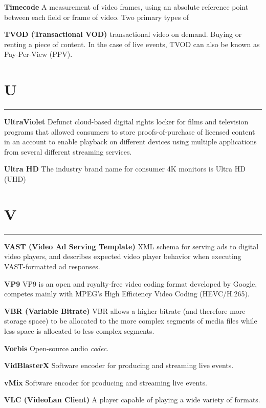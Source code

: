 \smallskip
\textbf{Timecode}
A measurement of video frames, using an absolute reference point between each field or frame of video. Two primary types of

\smallskip
\textbf{TVOD (Transactional VOD)}
transactional video on demand. Buying or renting a piece of content. In the case of live events, TVOD can also be known as Pay-Per-View (PPV).


\section{U}
\hrule

\medskip
\textbf{UltraViolet}
Defunct cloud-based digital rights locker for films and television programs that allowed consumers to store proofs-of-purchase of licensed content in an account to enable playback on different devices using multiple applications from several different streaming services.

\smallskip
\textbf{Ultra HD}
The industry brand name for consumer 4K monitors is Ultra HD (UHD)

\section{V}
\hrule

\medskip
\textbf{VAST (Video Ad Serving Template)}
XML schema for serving ads to digital video players, and describes expected video player behavior when executing VAST-formatted ad responses.

\smallskip
\textbf{VP9}
VP9 is an open and royalty-free video coding format developed by Google, competes mainly with MPEG's High Efficiency Video Coding (HEVC/H.265).

\smallskip
\textbf{VBR (Variable Bitrate)}
VBR allows a higher bitrate (and therefore more storage space) to be allocated to the more complex segments of media files while less space is allocated to less complex segments.

\smallskip
\textbf{Vorbis}
Open-source audio \textit{codec}.

\smallskip
\textbf{VidBlasterX}
Software encoder for producing and streaming live events.

\smallskip
\textbf{vMix}
Software encoder for producing and streaming live events.

\smallskip
\textbf{VLC (VideoLan Client)}
A player capable of playing a wide variety of formats.

